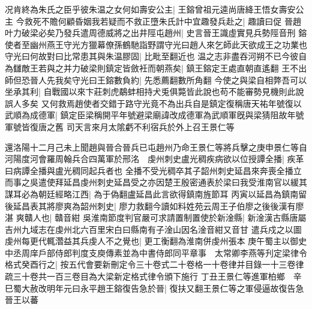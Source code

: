 况肯終為朱氏之臣乎彼朱温之女何如壽安公主|{
	王鎔曾祖元逵尚唐絳王悟女壽安公主}
今救死不贍何顧昏姻我若疑而不救正墮朱氏計中宜趣發兵赴之|{
	趣讀曰促}
晉趙叶力破梁必矣乃發兵遣周德威將之出井陘屯趙州|{
	史言晉王識虛實見兵勢陘音刑}
鎔使者至幽州燕王守光方獵幕僚孫鶴馳詣野謂守光曰趙人來乞師此天欲成王之功業也守光曰何故對曰比常患其與朱温膠固|{
	比毗至翻近也}
温之志非盡吞河朔不已今彼自為讎敵王若與之并力破梁則鎮定皆斂衽而朝燕矣|{
	鎮王鎔定王處直朝直遙翻}
王不出師但恐晉人先我矣守光曰王鎔數負約|{
	先悉薦翻數所角翻}
今使之與梁自相弊吾可以坐承其利|{
	自戰國以來卞莊刺虎鷸蚌相持犬兎俱斃皆此說也苟不能審勢見機則此說誤人多矣}
又何救焉趙使者交錯于路守光竟不為出兵自是鎮定復稱唐天祐年號復以武順為成德軍|{
	鎮定臣梁稱開平年號避梁廟諱改成德軍為武順軍旣與梁猜阻故年號軍號皆復唐之舊}
司天言來月太隂虧不利宿兵於外上召王景仁等

還洛陽十二月己未上聞趙與晉合晉兵已屯趙州乃命王景仁等將兵擊之庚申景仁等自河陽度河會羅周翰兵合四萬軍於邢洺　虔州刺史盧光稠疾病欲以位授譚全播|{
	疾革曰病譚全播與盧光稠同起兵者也}
全播不受光稠卒其子韶州刺史延昌來奔喪全播立而事之吳遣使拜延昌虔州刺史延昌受之亦因楚王殷密通表於梁曰我受淮南官以緩其謀耳必為朝廷經略江西|{
	為于偽翻盧延昌此言欲得鎮南旌節耳}
丙寅以延昌為鎮南留後延昌表其將廖爽為韶州刺史|{
	廖力救翻今讀如料姓苑云周王子伯廖之後後漢有廖湛}
爽贛人也|{
	贛音紺}
吳淮南節度判官嚴可求請置制置使於新淦縣|{
	新淦漢古縣唐屬吉州九域志在虔州北六百里宋白曰縣南有子淦山因名淦音紺又音甘}
遣兵戍之以圖虔州每更代輒濳益其兵虔人不之覺也|{
	更工衡翻為淮南併虔州張本}
庚午蜀主以御史中丞周庠戶部侍郎判度支庾傳素並為中書侍郎同平章事　太常卿李燕等刋定梁律令格式癸酉行之|{
	按五代會要新刪定令三十卷式二十卷格一十卷律并目錄一十三卷律疏三十卷共一百三卷目為大梁新定格式律令頒下施行}
丁丑王景仁等進軍柏鄉　辛巳蜀大赦改明年元曰永平趙王鎔復告急於晉|{
	復扶又翻王景仁等之軍侵逼故復告急}
晉王以蕃

